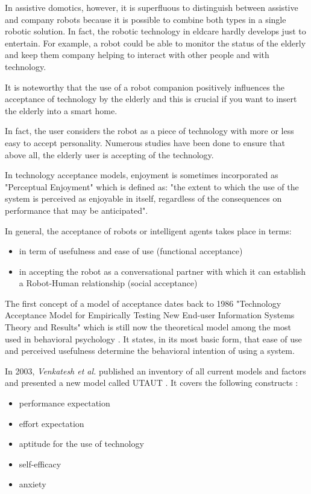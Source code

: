 \documentclass{thesisreport}
\begin{document}
 In assistive domotics, however, it is superfluous to distinguish between assistive and company robots because it is possible to combine both types in a single robotic solution. In fact, the robotic technology in eldcare hardly develops just to entertain.
 For example, a robot could be able to monitor the status of the elderly and keep them company helping to interact with other people and with technology.
 
 It is noteworthy that the use of a robot companion positively influences the acceptance of technology by the elderly and this is crucial if you want to insert the elderly into a smart home.
 
 In fact, the user considers the robot as a piece of technology with more or less easy to accept personality.
 Numerous studies have been done to ensure that above all, the elderly user is accepting of the technology.
 
 In technology acceptance models, enjoyment is sometimes incorporated as "Perceptual Enjoyment" which is defined as: "the extent to which the use of the system is perceived as enjoyable in itself, regardless of the consequences on performance that may be anticipated".
 
 In general, the acceptance of robots or intelligent agents takes place in terms:
 \begin{itemize}
     \item in term of usefulness and ease of use (functional acceptance)
     \item in accepting the robot as a conversational partner with which it can establish a Robot-Human relationship (social acceptance)
 \end{itemize}
 
 The first concept of a model of acceptance dates back to 1986 "Technology Acceptance Model for Empirically Testing New End-user Information Systems Theory and Results" which is still now the theoretical model among the most used in behavioral psychology \cite{davis1985technology,enjoymentModels}.
 It states, in its most basic form, that ease of use and perceived usefulness determine the behavioral intention of using a system.
 
 In 2003, \textit{Venkatesh et al.} published an inventory of all current models and factors and presented a new model called UTAUT \cite{venkatesh2003user,enjoymentModels}. It covers the following constructs :
 \begin{itemize}
     \item performance expectation
     \item effort expectation
     \item aptitude for the use of technology
     \item self-efficacy
     \item anxiety
 \end{itemize}
 
\end{document}
